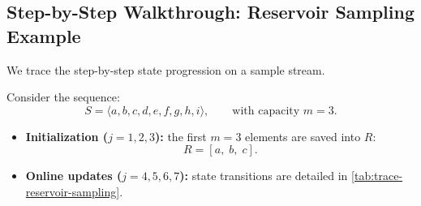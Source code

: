 \FloatBarrier
\subsection{Step-by-Step Walkthrough: Reservoir Sampling Example}
We trace the step-by-step state progression on a sample stream.

\begin{example}
Consider the sequence:
\begin{equation}
  S = \langle a, b, c, d, e, f, g, h, i \rangle, \qquad \text{with capacity } m = 3.
\end{equation}
\begin{itemize}
  \item \textbf{Initialization ($j = 1, 2, 3$):} the first $m = 3$ elements are saved into $R$:
  \begin{equation}
    R = [a, \; b, \; c].
  \end{equation}
  \item \textbf{Online updates ($j = 4, 5, 6, 7$):} state transitions are detailed in \autoref{tab:trace-reservoir-sampling}.
\end{itemize}

\begin{table}[H]
  \centering
  \caption{Step-by-step trace of Reservoir Sampling ($m = 3$).}
  \label{tab:trace-reservoir-sampling}
\end{table}
\end{example}

